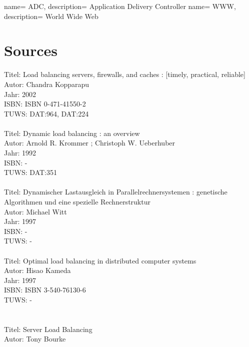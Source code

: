 \documentclass[12p]{article}
\begin{document}
	\newpage
	\listoffigures
	 {
		name= ADC,
		description= {Application Delivery Controller}
	}
	 {
		name= WWW,
		description= {World Wide Web}
	}
	\printglossaries
	
	\newpage
	
	
	
	\newpage
	\section{Sources}
	Titel:    Load balancing servers, firewalls, and caches : [timely, practical, reliable]\\
	Autor:    Chandra Kopparapu\\
	Jahr:    2002\\
	ISBN:    ISBN 0-471-41550-2\\
	TUWS:    DAT:964, DAT:224\\
	\\
	Titel:    Dynamic load balancing : an overview\\
	Autor:    Arnold R. Krommer ; Christoph W. Ueberhuber\\
	Jahr:    1992\\
	ISBN:     -\\
	TUWS:    DAT:351\\
	\\
	Titel:    Dynamischer Lastausgleich in Parallelrechnersystemen : genetische Algorithmen und eine spezielle Rechnerstruktur\\
	Autor:    Michael Witt\\
	Jahr:    1997\\
	ISBN:    -\\
	TUWS:    -\\
	\\
	Titel:    Optimal load balancing in distributed computer systems\\
	Autor:    Hisao Kameda\\
	Jahr:    1997\\
	ISBN:    ISBN 3-540-76130-6\\
	TUWS:     -\\
	\\
	\\
	Titel:     Server Load Balancing\\
	Autor:     Tony Bourke\\
\end{document}
